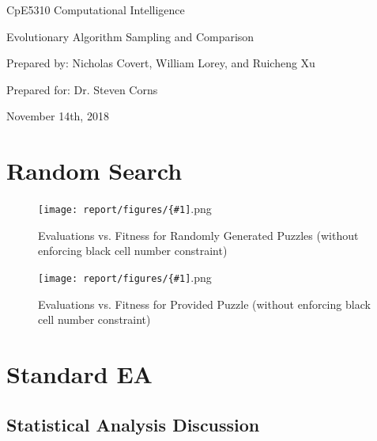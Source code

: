 \documentclass[11pt]{article}
\newcommand{\addgraphic}[1]{\centerline{\texttt{[image: report/figures/\{\#1]}.png}}}
\begin{document}
\thispagestyle{empty}
\begin{center}
\begin{minipage}{0.75\linewidth}
\centering

\vspace{6.2cm}

{\Large CpE5310 Computational Intelligence\par}
\vspace{0.2cm}

{\large Evolutionary Algorithm Sampling and Comparison\par}
\vspace{3cm}

{\large Prepared by: Nicholas Covert, William Lorey, and Ruicheng Xu\par}
\vspace{0.2cm}

{\large Prepared for: Dr. Steven Corns}
\vspace{3cm}

{\large November 14th, 2018}

\end{minipage}
\end{center}

\clearpage

\tableofcontents

\clearpage


\section{Random Search}

\begin{figure}[H]
    \addgraphic{random_gen_soln_graph}
    \caption{Evaluations vs. Fitness for Randomly Generated Puzzles (without enforcing black cell number constraint)}
    \label{fig:rand_search_rand}
\end{figure}

\begin{figure}[H]
    \addgraphic{website_puzzle_soln_graph}
    \caption{Evaluations vs. Fitness for Provided Puzzle (without enforcing black cell number constraint)}
    \label{fig:rand_search_web}
\end{figure}


\section{Standard EA}

\subsection{Statistical Analysis Discussion}
\end{document}
